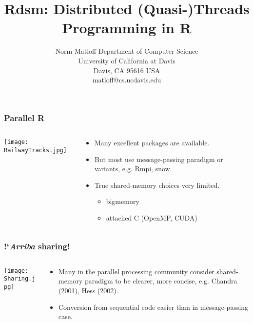 \documentclass{beamer}
\title{Rdsm: Distributed (Quasi-)Threads Programming in R}
\author{
Norm Matloff 
Department of Computer Science \\
University of California at Davis \\
Davis, CA 95616 USA \\
matloff@cs.ucdavis.edu 
}
\date{}
\begin{document}
 

\begin{frame}
\titlepage
\end{frame}

\begin{frame}
\frametitle{Parallel R}


\begin{columns}

   \begin{column}{0.3\textwidth}
   \texttt{[image: RailwayTracks.jpg]}
   \end{column}

   \begin{column}{0.7\textwidth}

   \begin{itemize}

   \item Many excellent packages are available.
   \pause

   \item But most use message-passing paradigm or variants, e.g. Rmpi, snow.
   \pause

   \item True shared-memory choices very limited.
   \pause

      \begin{itemize}
      \item bigmemory
      \item attached C (OpenMP, CUDA)
      \end{itemize}

   \end{itemize}

   \end{column}

\end{columns}

\end{frame}

\begin{frame}
\frametitle{!`{\it Arriba} sharing!}
\pause

\begin{columns}

   \begin{column}{0.3\textwidth}
   \texttt{[image: Sharing.jpg]}
   \end{column}

   \begin{column}{0.7\textwidth}
   \begin{itemize}
   \item Many in the parallel processing community consider shared-memory 
   paradigm to be clearer, more concise, e.g. Chandra (2001), Hess 
   (2002).
   \pause
   \item Conversion from sequential code easier than in message-passing
   case.
   \end{itemize}
   \end{column}

\end{columns}

\end{frame}
\end{document}
